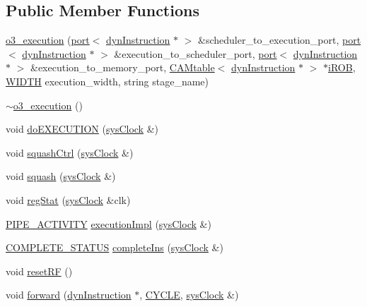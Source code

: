 \subsection*{Public Member Functions}
\begin{DoxyCompactItemize}
\item 
\hyperlink{classo3__execution_aa727dbc0730a04adac30d57796c7c769}{o3\_\-execution} (\hyperlink{classport}{port}$<$ \hyperlink{classdynInstruction}{dynInstruction} $\ast$ $>$ \&scheduler\_\-to\_\-execution\_\-port, \hyperlink{classport}{port}$<$ \hyperlink{classdynInstruction}{dynInstruction} $\ast$ $>$ \&execution\_\-to\_\-scheduler\_\-port, \hyperlink{classport}{port}$<$ \hyperlink{classdynInstruction}{dynInstruction} $\ast$ $>$ \&execution\_\-to\_\-memory\_\-port, \hyperlink{classCAMtable}{CAMtable}$<$ \hyperlink{classdynInstruction}{dynInstruction} $\ast$ $>$ $\ast$\hyperlink{backend_2parser_8cpp_ad73ae25f81e6e99482f3fbd5ba9664ce}{iROB}, \hyperlink{global_2global_8h_a6fa2e24b8a418fa215e183264cbea3aa}{WIDTH} execution\_\-width, string stage\_\-name)
\item 
\hyperlink{classo3__execution_a33a63fc56bf57ef6a470fbad5af5efcc}{$\sim$o3\_\-execution} ()
\item 
void \hyperlink{classo3__execution_ad3e4a2e10bfcad9fa8c73b77c3b9fffb}{doEXECUTION} (\hyperlink{classsysClock}{sysClock} \&)
\item 
void \hyperlink{classo3__execution_a590c0557a738cccb6ef7d8234743aa6f}{squashCtrl} (\hyperlink{classsysClock}{sysClock} \&)
\item 
void \hyperlink{classo3__execution_a38bcffde43ee6d4935c251b47e52a85c}{squash} (\hyperlink{classsysClock}{sysClock} \&)
\item 
void \hyperlink{classo3__execution_aef41940af13033c3736d7b6627efd39f}{regStat} (\hyperlink{classsysClock}{sysClock} \&clk)
\item 
\hyperlink{unit_2stage_8h_ab00e4188e8b8974fecb1dfd12764cbb1}{PIPE\_\-ACTIVITY} \hyperlink{classo3__execution_a2565c18ef20ce1e0ff72f5399831075a}{executionImpl} (\hyperlink{classsysClock}{sysClock} \&)
\item 
\hyperlink{unit_2stage_8h_a7de04de95175471455cf906d80af3968}{COMPLETE\_\-STATUS} \hyperlink{classo3__execution_ac6ce02086cf32b3554da1397ab35e714}{completeIns} (\hyperlink{classsysClock}{sysClock} \&)
\item 
void \hyperlink{classo3__execution_abb15c03915098a0ff1b56969a667efe6}{resetRF} ()
\item 
void \hyperlink{classo3__execution_ae721d2652e94e7f38d74707ecde6c12e}{forward} (\hyperlink{classdynInstruction}{dynInstruction} $\ast$, \hyperlink{global_2global_8h_a7e19a550ec11d1ed921deb20c22efb5b}{CYCLE}, \hyperlink{classsysClock}{sysClock} \&)
\end{DoxyCompactItemize}


